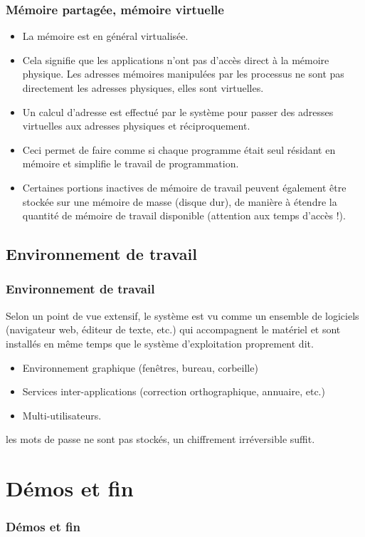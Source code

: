 \documentclass[xcolor=svgnames]{beamer}
\begin{document}
\begin{frame}
  \frametitle{Mémoire partagée, mémoire virtuelle}
  \begin{itemize}
\item La mémoire est en général virtualisée. \pause
\item Cela signifie que les applications n'ont pas d'accès direct à la
  mémoire physique. Les adresses mémoires manipulées par les processus
  ne sont pas directement les adresses physiques, elles sont
  virtuelles.\pause
  \item Un calcul d'adresse est effectué par le système pour passer
    des adresses virtuelles aux adresses physiques et
    réciproquement.\pause 
  \item Ceci permet de faire comme si chaque programme était seul
    résidant en mémoire et simplifie le travail de programmation.\pause
  \item Certaines portions inactives de mémoire de travail peuvent
    également être stockée sur une mémoire de masse (disque dur), de
    manière à étendre la quantité de mémoire de
    travail disponible (attention aux \alert{temps d'accès} !).
  \end{itemize}
\end{frame}

\subsection{Environnement de travail}
\begin{frame}
  \frametitle{Environnement de travail}
  Selon un point de vue extensif, le système est vu comme un ensemble
  de logiciels (navigateur web, éditeur de texte, etc.)  qui
  accompagnent le matériel et sont installés en même temps que le
  système d'exploitation proprement dit.\pause
\begin{itemize}
\item Environnement graphique (fenêtres, bureau, corbeille) \pause
\item Services inter-applications (correction orthographique, annuaire, etc.)\pause
\item Multi-utilisateurs.\pause 
\end{itemize}

 les mots de passe ne sont pas stockés, un chiffrement irréversible suffit.
\end{frame}


\section[Démos]{Démos et fin}
\begin{frame}
  \frametitle{Démos et fin}
\end{frame}
\end{document}
